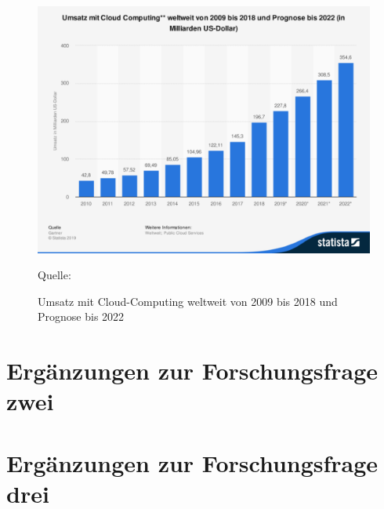 \begin{figure}[H]
	\centering
	\includegraphics[scale=0.43]{img/statistic_id195760_prognose-zum-umsatz-mit-cloud-computing-weltweit-bis-2022.pdf}
	\caption{Umsatz mit Cloud-Computing weltweit von 2009 bis 2018 und Prognose bis 2022 }
	{\footnotesize Quelle: \cite{gartner_cloud_2019}}
	\label{abb:umsatzprognoseCC}
\end{figure}


\chapter{Ergänzungen zur Forschungsfrage zwei} \label{appendixFF2}



\chapter{Ergänzungen zur Forschungsfrage drei} \label{appendixFF3}


